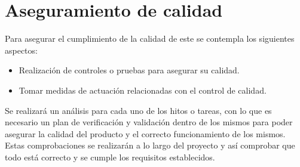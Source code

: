 
\section{Aseguramiento de calidad}
Para asegurar el cumplimiento de la calidad de este se contempla los siguientes aspectos:\\

\begin{itemize}
	\item Realización de controles o pruebas para asegurar su calidad.
	\item Tomar medidas de actuación relacionadas con el control de calidad.
\end{itemize}

Se realizará un análisis para cada uno de los hitos o tareas, con lo que es necesario un plan de verificación y validación dentro de los mismos para poder asegurar la calidad del producto y el correcto funcionamiento de los mismos. Estas comprobaciones se realizarán a lo largo del proyecto y así comprobar que todo está correcto y se cumple los requisitos establecidos.\\


